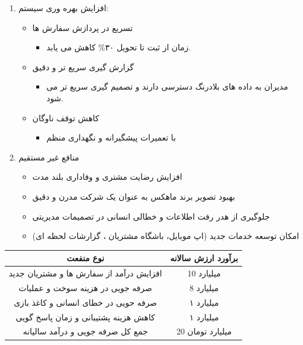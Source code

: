 \documentclass[12pt,a4paper]{report}
\begin{document}
\begin{enumerate}
\begin{itemize}
\begin{itemize}
ورود خودکار اطلاعات و حذف فرم های کاغذی ، خطای اداری را تا ۹۰\% کاهش می دهد.
		\end{itemize}
		\item 
کاهش هزینه نیروی انسانی در شعب 
		\begin{itemize}
			\item 
	بخشی از وظایف پذیرش و رهگیری توسط سیستم انجام می شود.
		\end{itemize}
				\item 
		صرفه جویی در هزینه کاغذ و مستند سازی
	\end{itemize}
\textbf{
برآورد صرفه جویی سالانه حدود ۲ الی ۲.۵ میلیارد تومان در عملیات روزانه.
}
	\item 
افزایش بهره وری سیستم:
	\begin{itemize}
	\item 
تسریع در پردازش سفارش ها
	\begin{itemize}
		\item 
زمان از ثبت تا تحویل ۳۰\% کاهش می یابد.
	\end{itemize}
\item 
گزارش گیری سریع تر و دقیق
\begin{itemize}
	\item 
مدیران به داده های بلادرنگ دسترسی دارند و تصمیم گیری سریع تر می شود.
\end{itemize}
\item 
کاهش توقف ناوگان
\begin{itemize}
	\item 
با تعمیرات پیشگیرانه و نگهداری منظم
\end{itemize}
\end{itemize}
	\item 
منافع غیر مستقیم
\begin{itemize}
\item 
افزایش رضایت مشتری و وفاداری بلند مدت
\item 
بهبود تصویر برند ماهکس به عنوان یک شرکت مدرن و دقیق
\item 
جلوگیری از هدر رفت اطلاعات و خطالی انسانی در تصمیمات مدیریتی 
\item 
امکان توسعه خدمات جدید (اپ موبایل، باشگاه مشتریان ، گزارشات لحظه ای)
\end{itemize}
\end{enumerate}

\begin{center}
	\begin{tabular}{|c|c|}
		\hline
		نوع منفعت &برآورد ارزش سالانه \\
		\hline
افزایش درآمد از سفارش ها و مشتریان جدید & 10 میلیارد\\
		\hline
	صرفه جویی در هزینه سوخت و عملیات  & 8 میلیارد \\
		\hline
	صرفه حویی در خطای انسانی و کاغذ بازی & ‍۱ میلیارد \\
		\hline
		کاهش هزینه پشتیبانی و زمان پاسخ گویی & ۱ میلیارد\\
		\hline
		جمع کل صرفه جویی و درآمد سالیانه & 20 میلیارد تومان \\
		\hline
	\end{tabular}
\end{center}
\newpage
\end{document}
